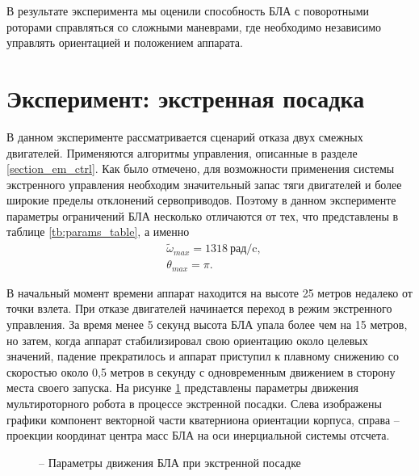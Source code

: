 В результате эксперимента мы оценили способность БЛА с поворотными роторами справляться со сложными маневрами, где необходимо независимо управлять ориентацией и положением аппарата.

\section{Эксперимент: экстренная посадка}

В данном эксперименте рассматривается сценарий отказа двух смежных двигателей. Применяются алгоритмы управления, описанные в разделе \ref{section_em_ctrl}. Как было отмечено, для возможности применения системы экстренного управления необходим значительный запас тяги двигателей и более широкие пределы отклонений сервоприводов. Поэтому в данном эксперименте параметры ограничений БЛА несколько отличаются от тех, что представлены в таблице \ref{tb:params_table}, а именно
\begin{equation}
\begin{aligned}
&\tilde{\omega}_{max} = 1318 \ \text{рад/c},
\\
&\theta_{max} = \pi.
\end{aligned}
\end{equation}

В начальный момент времени аппарат находится на высоте 25 метров недалеко от точки взлета.
При отказе двигателей начинается переход в режим экстренного управления.
За время менее 5 секунд высота БЛА упала более чем на 15 метров, но затем, когда аппарат стабилизировал свою ориентацию около целевых значений, падение прекратилось и аппарат приступил к плавному снижению со скоростью около 0,5 метров в секунду с одновременным движением в сторону места своего запуска.
На рисунке \ref{fig:em_coords} представлены параметры движения мультироторного робота в процессе экстренной посадки. Слева изображены графики компонент векторной части кватерниона ориентации корпуса, справа -- проекции координат центра масс БЛА на оси инерциальной системы отсчета.
\begin{figure}
	\centering
	\hfil
	\subfloat[координата x]{\texttt{[image: em/x]}}
	
	 \hfil 
	\subfloat[координата y]{\texttt{[image: em/y]}}  
	
	\hfil
	\subfloat[координата z]{\texttt{[image: em/z]}}
	\caption{ -- Параметры движения БЛА при экстренной посадке}
	\label{fig:em_coords}
\end{figure}